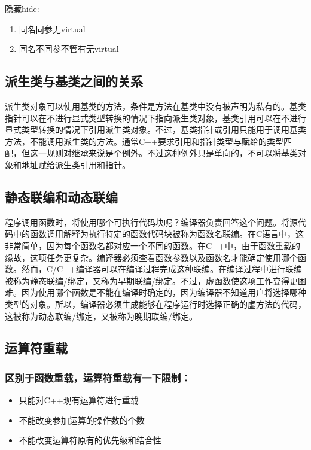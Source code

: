 \documentclass{article}
\begin{document}
\begin{CJK}{UTF8}{gbsn}
隐藏hide:
\begin{enumerate}
\itemsep=-3pt
\item 同名同参无virtual
\item 同名不同参不管有无virtual
\end{enumerate}

\subsection{派生类与基类之间的关系}

派生类对象可以使用基类的方法，条件是方法在基类中没有被声明为私有的。基类指针可以在不进行显式类型转换的情况下指向派生类对象，基类引用可以在不进行显式类型转换的情况下引用派生类对象。不过，基类指针或引用只能用于调用基类方法，不能调用派生类的方法。通常C++要求引用和指针类型与赋给的类型匹配，但这一规则对继承来说是个例外。不过这种例外只是单向的，不可以将基类对象和地址赋给派生类引用和指针。

\subsection{静态联编和动态联编}

程序调用函数时，将使用哪个可执行代码块呢？编译器负责回答这个问题。将源代码中的函数调用解释为执行特定的函数代码块被称为函数名联编。在C语言中，这非常简单，因为每个函数名都对应一个不同的函数。在C++中，由于函数重载的缘故，这项任务更复杂。编译器必须查看函数参数以及函数名才能确定使用哪个函数。然而，C/C++编译器可以在编译过程完成这种联编。在编译过程中进行联编被称为静态联编/绑定，又称为早期联编/绑定。不过，虚函数使这项工作变得更困难。因为使用哪个函数是不能在编译时确定的，因为编译器不知道用户将选择哪种类型的对象。所以，编译器必须生成能够在程序运行时选择正确的虚方法的代码，这被称为动态联编/绑定，又被称为晚期联编/绑定。

\subsection{运算符重载}

\subsubsection{区别于函数重载，运算符重载有一下限制：}
\begin{itemize}
\itemsep=-3pt
\item 只能对C++现有运算符进行重载
\item 不能改变参加运算的操作数的个数
\item 不能改变运算符原有的优先级和结合性
\end{itemize}


\end{CJK}
\end{document}
